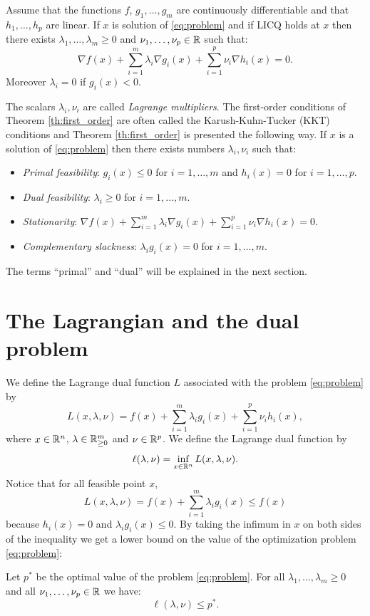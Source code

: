 \documentclass[11pt,nocut]{article}
\begin{document}
\begin{theorem}\label{th:first_order}
	Assume that the functions $f$, $g_1, \dots, g_m$ are continuously differentiable and that $h_1, \dots, h_p$ are linear. If $x$ is solution of \eqref{eq:problem} and if LICQ holds at $x$
	then there exists $\lambda_1, \dots, \lambda_m \geq 0$ and $\nu_1, \dots, \nu_p \in \mathbb{R}$ such that:
	\begin{equation}\label{eq:kkt}
		\nabla f(x) + \sum_{i=1}^m \lambda_i \nabla g_i(x) + \sum_{i=1}^p \nu_i \nabla h_i(x) = 0.
	\end{equation}
	Moreover $\lambda_i = 0$ if $g_i(x) < 0$.
\end{theorem}

The scalars $\lambda_i, \nu_i$ are called \emph{Lagrange multipliers}.
The first-order conditions of Theorem \ref{th:first_order} are often called the Karush-Kuhn-Tucker (KKT) conditions and Theorem \ref{th:first_order} is presented the following way.
If $x$ is a solution of \eqref{eq:problem} then there exists numbers $\lambda_i,\nu_i$ such that:
\begin{itemize}
	\item \emph{Primal feasibility}: $g_i(x) \leq 0$ for $i=1, \dots, m$ and $h_i(x) = 0$ for $i=1, \dots, p$.
	\item \emph{Dual feasibility}: $\lambda_i \geq 0$ for $i=1, \dots, m$.
	\item \emph{Stationarity}: $\nabla f(x) + \sum\limits_{i=1}^m \lambda_i \nabla g_i(x) + \sum\limits_{i=1}^p \nu_i \nabla h_i(x) = 0$.
	\item \emph{Complementary slackness}: $\lambda_i g_i(x) = 0$ for $i = 1 ,\dots, m$.
\end{itemize}
The terms ``primal'' and ``dual'' will be explained in the next section.

\section{The Lagrangian and the dual problem}

We define the Lagrange dual function $L$ associated with the problem \eqref{eq:problem} by
\begin{equation}
	L(x,\lambda,\nu) = 
	f(x) + \sum_{i=1}^m \lambda_i g_i(x) + \sum_{i=1}^p \nu_i h_i(x),
\end{equation}
where $x \in \mathbb{R}^n$, $\lambda \in \mathbb{R}_{\geq 0}^m$ and $\nu \in \mathbb{R}^p$. We define the Lagrange dual function by
$$
\ell(\lambda,\nu) = \inf_{x \in \mathbb{R}^n} L(x,\lambda,\nu).
$$
Notice that for all feasible point $x$,
$$
L(x,\lambda,\nu)
= f(x) + \sum_{i=1}^m \lambda_i g_i(x) \leq f(x)
$$
because $h_i(x) = 0$ and $\lambda_i g_i(x) \leq 0$. By taking the infimum in $x$ on both sides of the inequality we get a lower bound on the value of the optimization problem \eqref{eq:problem}:
\begin{proposition}
	Let $p^*$ be the optimal value of the problem \eqref{eq:problem}.
	For all $\lambda_1, \dots, \lambda_m \geq 0$ and all $\nu_1, \dots,\nu_p \in \mathbb{R}$ we have:
	\begin{equation}\label{eq:dual_lower_bound}
		\ell(\lambda,\nu) \leq p^*.
	\end{equation}
\end{proposition}
\end{document}
